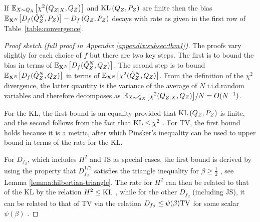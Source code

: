 \begin{theorem}\label{thm:fast-KL-rate}
If
$\mathbb{E}_{X\sim Q_X}\bigl[\chi^2\bigl(Q_{Z|X}, Q_Z\bigr)\bigr]$ and
$\mathrm{KL}\left( Q_{Z} , P_Z\right)$ are finite then the bias ${\mathbb{E}_{\mathbf{X}^N}\bigl[D_f( \hat{Q}_Z^N , P_Z)\bigr] - D_f\left( Q_{Z} , P_Z\right)}$ decays with rate as given in the first row of Table~\ref{table:convergence}.
\end{theorem}
\begin{proof}[Proof sketch (full proof in Appendix \ref{appendix:subsec:thm1})]
The proofs vary slightly for each choice of $f$ but there are two key steps. 
The first is to bound the bias in terms of ${\mathbb{E}_{\mathbf{X}^N}\big[D_f(\hat{Q}_Z^N, Q_Z)\big]}$. 
The second step is to bound ${\mathbb{E}_{\mathbf{X}^N}\bigl[D_f(\hat{Q}_Z^N, Q_Z)\bigr]}$ in terms of ${\mathbb{E}_{\mathbf{X}^N}\bigl[\chi^2(\hat{Q}_Z^N, Q_Z)\bigr]}$.
From the definition of the $\chi^2$ divergence, the latter quantity is the variance of the average of $N$ i.i.d.\:random variables and therefore decomposes as ${\mathbb{E}_{X\sim Q_X}\bigl[\chi^2(Q_{Z|X}, Q_Z)\bigr] / N} = O(N^{-1})$.

For the KL, the first bound is an equality provided that $\mathrm{KL}\left( Q_{Z} , P_Z\right)$ is finite, and the second follows from the fact that $\mathrm{KL} \leq \chi^2$ \citep{tsybakov2009}.
For TV, the first bound holds because it is a metric, after which Pinsker's inequality can be used to upper bound in terms of the rate for the KL.

For ${D_{f_\beta}}$, which includes $H^2$ and JS as special cases, the first bound is derived by using the property that $D^{1/2}_{f_\beta}$ satisfies the triangle inequality for $\beta \geq \frac{1}{2}$ \citep{hein05hilbertian}, see Lemma \ref{lemma:hilbertian-triangle}.
The rate for $H^2$ can then be related to that of the KL by the relation $H^2 \leq \mathrm{KL}$ \citep{tsybakov2009}, while for the other $D_{f_\beta}$ (including JS), it can be related to that of TV via the relation $D_{f_\beta} \leq \psi(\beta) \mathrm{TV}$ for some scalar $\psi(\beta)$ \citep{osterreicher2003new}.
\end{proof}

\medskip

